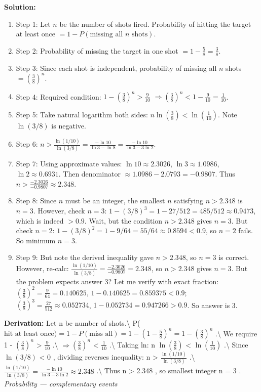 \documentclass[12pt,a4paper]{exam}
\begin{document}
\begin{questions}
\textbf{Solution:}
\begin{enumerate}
  \item Step 1: Let $n$ be the number of shots fired. Probability of hitting the target at least once $= 1 - P(\text{missing all } n \text{ shots})$.
  \item Step 2: Probability of missing the target in one shot $= 1 - \frac{5}{8} = \frac{3}{8}$.
  \item Step 3: Since each shot is independent, probability of missing all $n$ shots $= \left(\frac{3}{8}\right)^n$.
  \item Step 4: Required condition: $1 - \left(\frac{3}{8}\right)^n > \frac{9}{10}$ $\Rightarrow \left(\frac{3}{8}\right)^n < 1 - \frac{9}{10} = \frac{1}{10}$.
  \item Step 5: Take natural logarithm both sides: $n \ln\left(\frac{3}{8}\right) < \ln\left(\frac{1}{10}\right)$. Note $\ln(3/8)$ is negative.
  \item Step 6: $n > \frac{\ln(1/10)}{\ln(3/8)} = \frac{-\ln 10}{\ln 3 - \ln 8} = \frac{-\ln 10}{\ln 3 - 3\ln 2}$.
  \item Step 7: Using approximate values: $\ln 10 \approx 2.3026$, $\ln 3 \approx 1.0986$, $\ln 2 \approx 0.6931$. Then denominator $\approx 1.0986 - 2.0793 = -0.9807$. Thus $n > \frac{-2.3026}{-0.9807} \approx 2.348$.
  \item Step 8: Since $n$ must be an integer, the smallest $n$ satisfying $n > 2.348$ is $n = 3$. However, check $n=3$: $1-(3/8)^3 = 1-27/512 = 485/512 \approx 0.9473$, which is indeed $>0.9$. Wait, but the condition $n>2.348$ gives $n=3$. But check $n=2$: $1-(3/8)^2 = 1-9/64 = 55/64 \approx 0.8594 < 0.9$, so $n=2$ fails. So minimum $n=3$.
  \item Step 9: But note the derived inequality gave $n>2.348$, so $n=3$ is correct. However, re-calc: $\frac{\ln(1/10)}{\ln(3/8)} = \frac{-2.3026}{-0.9807} = 2.348$, so $n>2.348$ gives $n=3$. But the problem expects answer 3? Let me verify with exact fraction: $\left(\frac{3}{8}\right)^2 = \frac{9}{64} = 0.140625$, $1-0.140625=0.859375 < 0.9$; $\left(\frac{3}{8}\right)^3 = \frac{27}{512} \approx 0.052734$, $1-0.052734=0.947266 > 0.9$. So answer is 3.
\end{enumerate}
\textbf{Derivation:}
Let  n  be number of shots.\textbackslash{}
 P($\text{hit at least once}) = 1 - P(\text{miss all}) = 1 - \left(1 - \frac{5}{8}\right)^n = 1 - \left(\frac{3}{8}\right)^n$ .\textbackslash{}
We require  1 - $\left(\frac{3}{8}\right)^n$ > $\frac{9}{10}$ .\textbackslash{}
 $\Rightarrow \left(\frac{3}{8}\right)^n$ < $\frac{1}{10}$ .\textbackslash{}
Taking ln:  n $\ln\left(\frac{3}{8}\right)$ < $\ln\left(\frac{1}{10}\right)$ .\textbackslash{}
Since  $\ln(3/8)$ < 0 , dividing reverses inequality:  n > $\frac{\ln(1/10)}{\ln(3/8)}$ .\textbackslash{}
 $\frac{\ln(1/10)}{\ln(3/8)} = \frac{-\ln 10}{\ln 3 - 3\ln 2} \approx 2.348$ .\textbackslash{}
Thus  n > 2.348 , so smallest integer  n = 3 .
\hfill \textit{Probability — complementary events}
\vspace{0.3cm}


\end{questions}
\end{document}
